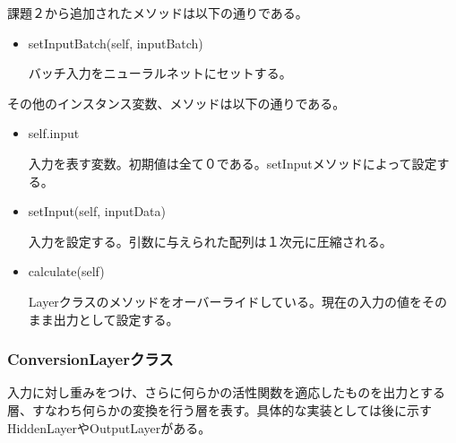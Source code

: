 \documentclass{ujarticle} %
\begin{document}
課題２から追加されたメソッドは以下の通りである。

\begin{itemize}
  \item setInputBatch(self, inputBatch)

  バッチ入力をニューラルネットにセットする。
\end{itemize}

その他のインスタンス変数、メソッドは以下の通りである。
\begin{itemize}
  \item self.input

  入力を表す変数。初期値は全て０である。setInputメソッドによって設定する。

  \item setInput(self, inputData)

  入力を設定する。引数に与えられた配列は１次元に圧縮される。

  \item calculate(self)

  Layerクラスのメソッドをオーバーライドしている。現在の入力の値をそのまま出力として設定する。
\end{itemize}

\subsubsection{ConversionLayerクラス}
入力に対し重みをつけ、さらに何らかの活性関数を適応したものを出力とする層、すなわち何らかの変換を行う層を表す。具体的な実装としては後に示すHiddenLayerやOutputLayerがある。
\end{document}
